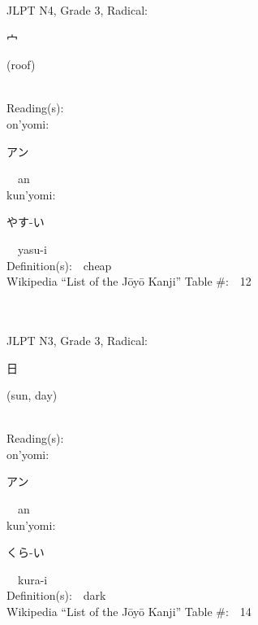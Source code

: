 \begin{multicols}{2}
{JLPT N4, Grade 3, Radical:\ \ {\begin{CJK}{UTF8}{min} 宀 \end{CJK}} (roof) } \\
Reading(s):\ \ \\
{\hspace*{1em}}on'yomi:\ \ \\
{\hspace*{2em}}{\begin{CJK}{UTF8}{min} アン \end{CJK}}\ \ an\ \ \\
{\hspace*{1em}}kun'yomi:\ \ \\
{\hspace*{2em}}{\begin{CJK}{UTF8}{min} やす-い \end{CJK}}\ \ yasu-i\ \ \\
Definition(s):\ \ cheap \\
Wikipedia ``List of the J\=oy\=o Kanji'' Table \#:\ \ 12 \\
\ \ \\
{\fontsize{34pt}{40pt}  }\ \ \\  %
{JLPT N3, Grade 3, Radical:\ \ {\begin{CJK}{UTF8}{min} 日 \end{CJK}} (sun, day) } \\
Reading(s):\ \ \\
{\hspace*{1em}}on'yomi:\ \ \\
{\hspace*{2em}}{\begin{CJK}{UTF8}{min} アン \end{CJK}}\ \ an\ \ \\
{\hspace*{1em}}kun'yomi:\ \ \\
{\hspace*{2em}}{\begin{CJK}{UTF8}{min} くら-い \end{CJK}}\ \ kura-i\ \ \\
Definition(s):\ \ dark \\
Wikipedia ``List of the J\=oy\=o Kanji'' Table \#:\ \ 14 \\
\ \ \\
{\fontsize{34pt}{40pt}  }\ \ \\  %

\end{multicols}
